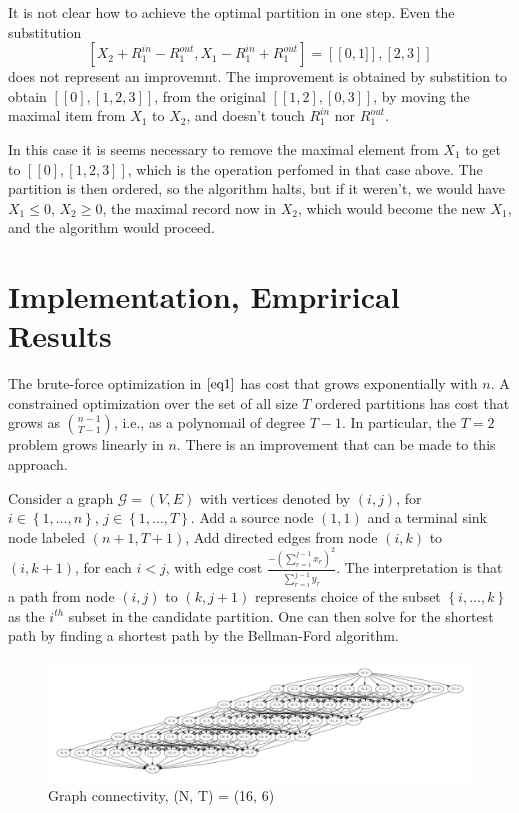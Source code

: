 \documentclass{article}
\theoremstyle{case}
\begin{document}
It is not clear how to achieve the optimal partition in one step. Even the substitution
\[
\left[ X_2 + R_1^{in} - R_1^{out}, X_1 - R_1^{in}+R_1^{out} \right] = \left[ \left[0,1] \right], \left[ 2, 3\right] \right]
\]
does not represent an improvemnt. The improvement is obtained by substition to obtain $\left[ \left[ 0 \right], \left[ 1, 2, 3\right]\right]$, from the original $\left[ \left[ 1, 2\right], \left[ 0, 3\right] \right]$, by moving the maximal item from $X_1$ to $X_2$, and doesn't touch $R_1^{in}$ nor $R_1^{out}$.

In this case it is seems necessary to remove the maximal element from $X_1$ to get to $\left[ \left[ 0 \right], \left[ 1, 2, 3\right]\right]$, which is the operation perfomed in that case above. The partition is then ordered, so the algorithm halts, but if it weren't, we would have $X_1 \leq 0$, $X_2 \geq 0$, the maximal record now in $X_2$, which would become the new $X_1$, and the algorithm would proceed. 

\section{Implementation, Emprirical Results}
The brute-force optimization in $\ref{eq1}$ has cost that grows exponentially with $n$. A constrained optimization over the set of all size $T$ ordered partitions has cost that grows as $\binom{n-1}{T-1}$, i.e., as a polynomail of degree $T-1$. In particular, the $T = 2$ problem grows linearly in $n$. There is an improvement that can be made to this approach.

Consider a graph $\mathcal{G} = \left( V, E\right)$ with vertices denoted by $\left( i, j\right)$, for $i \in \left\lbrace 1, \dots, n\right\rbrace$, $j \in \left\lbrace 1, \dots, T\right\rbrace$. Add a source node $\left( 1, 1\right)$ and a terminal sink node labeled $\left( n+1, T+1\right)$, Add directed edges from node $\left( i,k \right)$ to $\left( i, k+1\right)$, for each $i < j$, with edge cost $\frac{-\left(\sum_{r=i}^{j-1} x_r\right)^2}{\sum_{r=i}^{j-1} y_r}$. The interpretation is that a path from node $\left( i, j\right)$ to $\left( k, j+1\right)$ represents choice of the subset $\left\lbrace i, \dots, k\right\rbrace$ as the $i^{th}$ subset in the candidate partition. One can then solve for the shortest path by finding a shortest path by the Bellman-Ford algorithm. 


% 
\begin{figure}
  \includegraphics[scale=.22]{16_6_unlabeled.pdf}
  \caption{Graph connectivity, (N, T) = (16, 6)}  
\end{figure}
\end{document}
